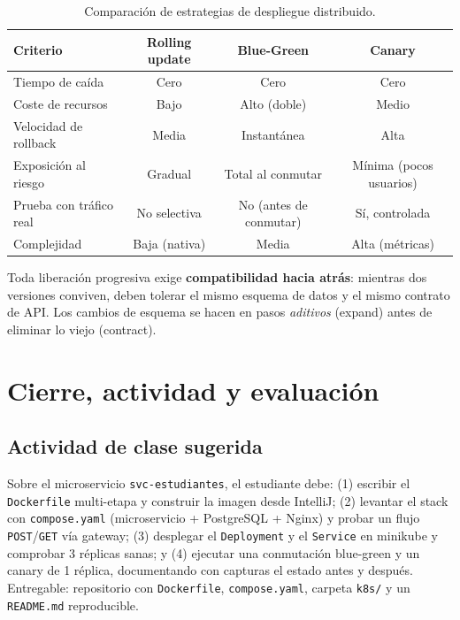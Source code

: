 \documentclass[11pt,a4paper]{article}
\begin{document}
\begin{table}[h]
\centering
\caption{Comparaci\'on de estrategias de despliegue distribuido.}
\label{tab:estrategias}
\small
\begin{tabularx}{\linewidth}{@{}l C C C@{}}
\toprule
\textbf{Criterio} & \textbf{Rolling update} & \textbf{Blue-Green} & \textbf{Canary} \\
\midrule
Tiempo de ca\'ida & Cero & Cero & Cero \\
Coste de recursos & Bajo & Alto (doble) & Medio \\
Velocidad de rollback & Media & Instant\'anea & Alta \\
Exposici\'on al riesgo & Gradual & Total al conmutar & M\'inima (pocos usuarios) \\
Prueba con tr\'afico real & No selectiva & No (antes de conmutar) & S\'i, controlada \\
Complejidad & Baja (nativa) & Media & Alta (m\'etricas) \\
\bottomrule
\end{tabularx}
\end{table}

\begin{warnbox}
Toda liberaci\'on progresiva exige \textbf{compatibilidad hacia atr\'as}: mientras dos versiones conviven, deben tolerar el mismo esquema de datos y el mismo contrato de API. Los cambios de esquema se hacen en pasos \emph{aditivos} (expand) antes de eliminar lo viejo (contract).
\end{warnbox}

\section{Cierre, actividad y evaluaci\'on}

\subsection{Actividad de clase sugerida}

Sobre el microservicio \texttt{svc-estudiantes}, el estudiante debe: (1) escribir el \texttt{Dockerfile} multi-etapa y construir la imagen desde IntelliJ; (2) levantar el stack con \texttt{compose.yaml} (microservicio + PostgreSQL + Nginx) y probar un flujo \texttt{POST}/\texttt{GET} v\'ia gateway; (3) desplegar el \texttt{Deployment} y el \texttt{Service} en minikube y comprobar 3 r\'eplicas sanas; y (4) ejecutar una conmutaci\'on blue-green y un canary de 1 r\'eplica, documentando con capturas el estado antes y despu\'es. Entregable: repositorio con \texttt{Dockerfile}, \texttt{compose.yaml}, carpeta \texttt{k8s/} y un \texttt{README.md} reproducible.
\end{document}
